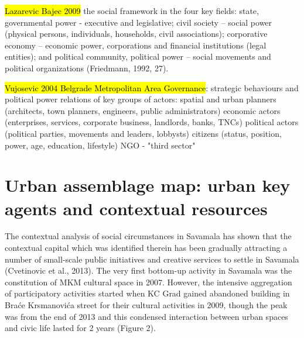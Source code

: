 \documentclass[11pt]{report}
\begin{document}
\hl{Lazarevic Bajec 2009}
the social framework in the four key fields: state, governmental
power  -  executive  and  legislative;  civil  society  –  social  power  (physical persons,  individuals,  households,  civil  associations);  corporative  economy –  economic  power,  corporations  and  financial  institutions  (legal  entities); and political community, political power – social movements and political organizations (Friedmann, 1992, 27).

\hl{Vujosevic 2004 Belgrade Metropolitan Area Governance}:
strategic behaviours and political power relations of key groups of actors:
    spatial and urban planners (architects, town planners, engineers, public administrators)
    economic actors (enterprises, services, corporate business, landlords, banks, TNCs)
    political actors (political parties, movements and leaders, lobbysts)
    citizens (status, position, power, age, education, lifestyle)
    NGO - "third sector"
    
\section{Urban assemblage map: urban key agents and contextual resources}

The contextual analysis of social circumstances in Savamala has shown that the contextual capital which was identified therein has been gradually attracting a number of small-scale public initiatives and creative services to settle in Savamala (Cvetinovic et al., 2013). The very first bottom-up activity in Savamala was the constitution of MKM cultural space in 2007. However, the intensive aggregation of participatory activities started when KC Grad gained abandoned building in Braće Krsmanovića street for their cultural activities in 2009, though the peak was from the end of 2013 and this condensed interaction between urban spaces and civic life lasted for 2 years (Figure 2).
\end{document}
